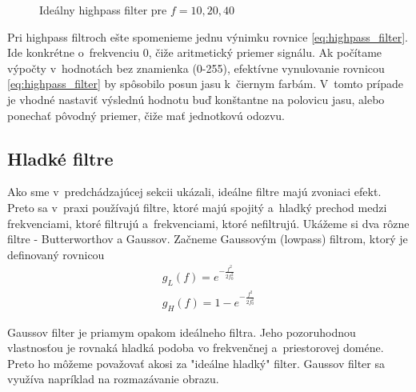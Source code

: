 \begin{figure}[htp]
    \def\path{obrazky/informatika/digitalne_filtre}
    \centering
    \caption{Ideálny highpass filter pre $f=10,20,40$}
    \label{fig:ideal_highpass_filter}
\end{figure}

Pri highpass filtroch ešte spomenieme jednu výnimku rovnice
\eqref{eq:highpass_filter}. Ide konkrétne o~frekvenciu 0, čiže
aritmetický priemer signálu.
Ak počítame výpočty v~hodnotách bez znamienka (0-255), efektívne
vynulovanie rovnicou \eqref{eq:highpass_filter} by spôsobilo posun jasu
k~čiernym farbám. V~tomto prípade je vhodné nastaviť výslednú hodnotu
buď konštantne na polovicu jasu, alebo ponechať pôvodný priemer, čiže
mať jednotkovú odozvu.

\subsection{Hladké filtre}
Ako sme v~predchádzajúcej sekcii ukázali, ideálne filtre majú zvoniaci
efekt. Preto sa v~praxi používajú filtre, ktoré majú spojitý a~hladký
prechod medzi frekvenciami, ktoré filtrujú a~frekvenciami, ktoré
nefiltrujú. Ukážeme si dva rôzne filtre - Butterworthov a Gaussov.
Začneme Gaussovým (lowpass) filtrom, ktorý je definovaný rovnicou
\begin{align*}
g_L(f) = e^{- \frac{f^2}{2 f_0^2}} \\
g_H(f) = 1 - e^{- \frac{f^2}{2 f_0^2}}
\end{align*}

Gaussov filter je priamym opakom ideálneho filtra. Jeho pozoruhodnou
vlastnosťou je rovnaká hladká podoba vo frekvenčnej a~priestorovej doméne.
Preto ho môžeme považovať akosi za "ideálne hladký" filter. Gaussov
filter sa využíva napríklad na rozmazávanie obrazu.

